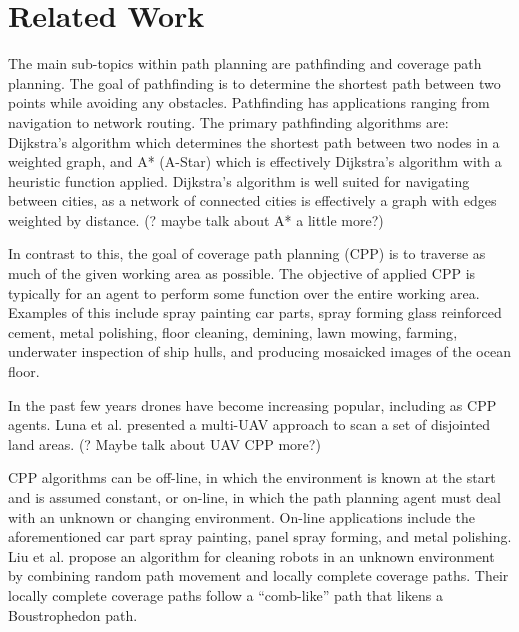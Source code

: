 \chapter{Related Work}\label{related_work}

The main sub-topics within path planning are pathfinding and coverage path planning.
The goal of pathfinding is to determine the shortest path between two points while avoiding any obstacles.
Pathfinding has applications ranging from navigation to network routing.
The primary pathfinding algorithms are: Dijkstra's algorithm\cite{Dijkstra, Improved_Dijkstra} which determines the shortest path between two nodes in a weighted graph, and A* (A-Star)\cite{A_Star_lit_review, A_Star_beginners, A_Star_in_computer_games} which is effectively Dijkstra's algorithm with a heuristic function applied.
Dijkstra's algorithm is well suited for navigating between cities\cite{Dijkstra_for_railroads}, as a network of connected cities is effectively a graph with edges weighted by distance.
(? maybe talk about A* a little more?)

In contrast to this, the goal of coverage path planning (CPP) is to traverse as much of the given working area as possible.
The objective of applied CPP is typically for an agent to perform some function over the entire working area.
Examples of this include spray painting car parts\cite{Automatic_spray_painting_path}, spray forming glass reinforced cement\cite{Robotic_grc_spraying}, metal polishing\cite{Metal_polishing_robot_sys}, floor cleaning\cite{CCPP_guidance_for_cleaning_robots}, demining\cite{CPP_demining}, lawn mowing\cite{CPP_autonomous_lawn_mower}, farming\cite{Vision_perception_auto_harvester, CPP_alg_agriculture}, underwater inspection of ship hulls\cite{CPP_inspect_complex_structures}, and producing mosaicked images of the ocean floor\cite{Terrain_covering_AUV}.

In the past few years drones have become increasing popular, including as CPP agents\cite{CPP_UAV_survey, CPP_2D_convex_regions_uav, CPP_multi_UAV, CPP_spraying_drones}.
Luna et al. presented a multi-UAV approach to scan a set of disjointed land areas\cite{CPP_multi_UAV}.
(? Maybe talk about UAV CPP more?)

CPP algorithms can be off-line, in which the environment is known at the start and is assumed constant, or on-line, in which the path planning agent must deal with an unknown or changing environment\cite{CPP_survey_for_robotics}.
On-line applications include the aforementioned car part spray painting, panel spray forming\cite{Robotic_grc_spraying}, and metal polishing.
Liu et al. propose an algorithm for cleaning robots in an unknown environment by combining random path movement and locally complete coverage paths\cite{CCPP_cleaning_robots}.
Their locally complete coverage paths follow a ``comb-like'' path that likens a Boustrophedon path.

